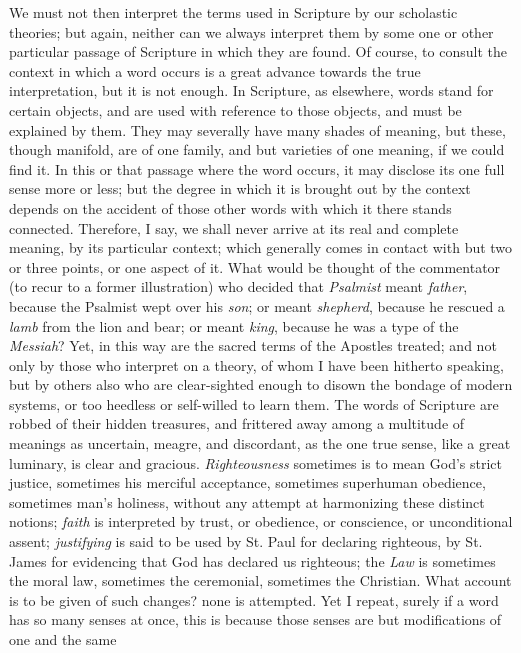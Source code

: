 We must not then interpret the terms used in Scripture by our
scholastic theories; but again, neither can we always interpret them
by some one or other particular passage of Scripture in which they are
found. Of course, to consult the context in which a word occurs is a
great advance towards the true interpretation, but it is not enough.
In Scripture, as elsewhere, words stand for certain objects, and
are used with reference to those objects, and must be explained by
them. They may severally have many shades of meaning, but these,
though manifold, are of one family, and but varieties of one meaning,
if we could find it. In this or that passage where the word occurs, it
may disclose its one full sense more or less; but the degree in which
it is brought out by the context depends on the accident of those
other words with which it there stands connected. Therefore, I say, we
shall never arrive at its real and complete meaning, by its particular
context; which generally comes in contact with but two or three
points, or one aspect of it. What would be thought of the commentator
(to recur to a former illustration) who decided that \emph{Psalmist}
meant \emph{father}, because the Psalmist wept over his \emph{son}; or
meant \emph{shepherd}, because he rescued a \emph{lamb} from the lion
and bear; or meant \emph{king}, because he was a type of the \emph{Messiah}?
Yet, in this way are the sacred terms of the Apostles treated; and not
only by those who interpret on a theory, of whom I have been hitherto
speaking, but by others also who are clear-sighted enough to disown
the bondage of modern systems, or too heedless or self-willed to learn
them. The words of Scripture are robbed of their hidden treasures, and
frittered away among a multitude of meanings as uncertain, meagre, and
discordant, as the one true sense, like a great luminary, is clear and
gracious. \emph{Righteousness} sometimes is to mean God's strict
justice, sometimes his merciful acceptance, sometimes superhuman
obedience, sometimes man's holiness, without any attempt at
harmonizing these distinct notions; \emph{faith} is interpreted by
trust, or obedience, or conscience, or unconditional assent; \emph{justifying}
is said to be used by St. Paul for declaring righteous, by St. James
for evidencing that God has declared us righteous; the \emph{Law} is
sometimes the moral law, sometimes the ceremonial, sometimes the
Christian. What account is to be given of such changes? none is
attempted. Yet I repeat, surely if a word has so many senses at once,
this is because those senses are but modifications of one and the same
